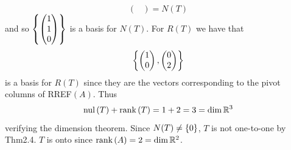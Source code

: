 \documentclass{exam}
\begin{document}
\begin{solution}
\[{\begin{pmatrix}
      \end{pmatrix}} = N(T)
    \]
    and so $\left\{\begin{pmatrix} 1 \\ 1 \\ 0 \end{pmatrix} \right\}$ is a basis for $N(T)$. For $R(T)$ we have that
    \[
      \left\{\begin{pmatrix}
        1 \\ 0
      \end{pmatrix}, \begin{pmatrix}
        0 \\ 2
      \end{pmatrix} \right\}
    \]
    is a basis for $R(T)$ since they are the vectors corresponding to the pivot columns of RREF$(A)$. Thus 
    \[
      \text{nul}\left(T\right) + \text{rank}\left(T\right) = 1 + 2 = 3 = \dim \mathbb R^3
    \]
    verifying the dimension theorem. Since $N(T) \neq \left\{0 \right\}$, $T$ is not one-to-one by Thm2.4. $T$ is onto since $\text{rank}\left(A\right) = 2 = \dim \mathbb R^2$.
  \end{solution}
\end{document}

